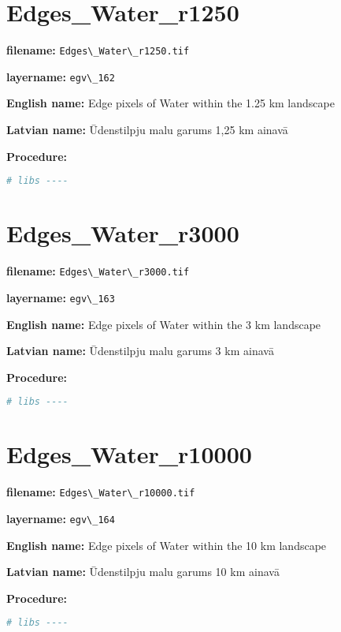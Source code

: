 \documentclass[
]{book}
\newcommand{\passthrough}[1]{#1}
\begin{document}
\section{Edges\_Water\_r1250}\label{ch06.162}

\textbf{filename:} \passthrough{\lstinline!Edges\_Water\_r1250.tif!}

\textbf{layername:} \passthrough{\lstinline!egv\_162!}

\textbf{English name:} Edge pixels of Water within the 1.25 km landscape

\textbf{Latvian name:} Ūdenstilpju malu garums 1,25 km ainavā

\textbf{Procedure:}

\begin{lstlisting}[language=R]
# libs ----
\end{lstlisting}

\section{Edges\_Water\_r3000}\label{ch06.163}

\textbf{filename:} \passthrough{\lstinline!Edges\_Water\_r3000.tif!}

\textbf{layername:} \passthrough{\lstinline!egv\_163!}

\textbf{English name:} Edge pixels of Water within the 3 km landscape

\textbf{Latvian name:} Ūdenstilpju malu garums 3 km ainavā

\textbf{Procedure:}

\begin{lstlisting}[language=R]
# libs ----
\end{lstlisting}

\section{Edges\_Water\_r10000}\label{ch06.164}

\textbf{filename:} \passthrough{\lstinline!Edges\_Water\_r10000.tif!}

\textbf{layername:} \passthrough{\lstinline!egv\_164!}

\textbf{English name:} Edge pixels of Water within the 10 km landscape

\textbf{Latvian name:} Ūdenstilpju malu garums 10 km ainavā

\textbf{Procedure:}

\begin{lstlisting}[language=R]
# libs ----
\end{lstlisting}
\end{document}
